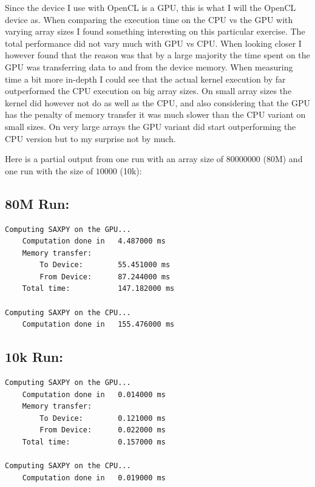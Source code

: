 \documentclass[a4paper, 12pt]{article}
\begin{document}
Since the device I use with OpenCL is a GPU, this is what I will the OpenCL device as. When comparing the execution time on the CPU vs the GPU with varying array sizes I found something interesting on this particular exercise. The total performance did not vary much with GPU vs CPU. When looking closer I however found that the reason was that by a large majority the time spent on the GPU was transferring data to and from the device memory. When measuring time a bit more in-depth I could see that the actual kernel execution by far outperformed the CPU execution on big array sizes. On small array sizes the kernel did however not do as well as the CPU, and also considering that the GPU has the penalty of memory transfer it was much slower than the CPU variant on small sizes. On very large arrays the GPU variant did start outperforming the CPU version but to my surprise not by much.

Here is a partial output from one run with an array size of $80 000 000$ (80M) and one run with the size of $10000$ (10k):

\subsection{80M Run:}
\begin{verbatim}
Computing SAXPY on the GPU...
    Computation done in   4.487000 ms
    Memory transfer:
        To Device:        55.451000 ms
        From Device:      87.244000 ms
    Total time:           147.182000 ms

Computing SAXPY on the CPU...
    Computation done in   155.476000 ms
\end{verbatim}

\subsection{10k Run:}
\begin{verbatim}
Computing SAXPY on the GPU...
    Computation done in   0.014000 ms
    Memory transfer:
        To Device:        0.121000 ms
        From Device:      0.022000 ms
    Total time:           0.157000 ms

Computing SAXPY on the CPU...
    Computation done in   0.019000 ms
\end{verbatim}

%
%
%
\end{document}
